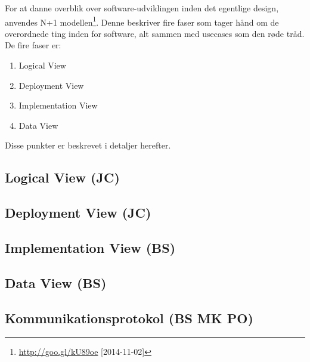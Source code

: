 For at danne overblik over software-udviklingen inden det egentlige design, anvendes N+1 modellen\footnote{\url{http://goo.gl/kU89oe} [2014-11-02]}.
Denne beskriver fire faser som tager hånd om de overordnede ting inden for software, alt sammen med usecases som den røde tråd.
De fire faser er:

\begin{enumerate}
	\item Logical View
	\item Deployment View
	\item Implementation View
	\item Data View
\end{enumerate}

Disse punkter er beskrevet i detaljer herefter.

\subsection{Logical View (JC)}


\clearpage
\subsection{Deployment View (JC)}



\subsection{Implementation View (BS)}


\subsection{Data View (BS)}


%

\subsection{Kommunikationsprotokol (BS MK PO)}\label{header:kommunikationsprotokol}
